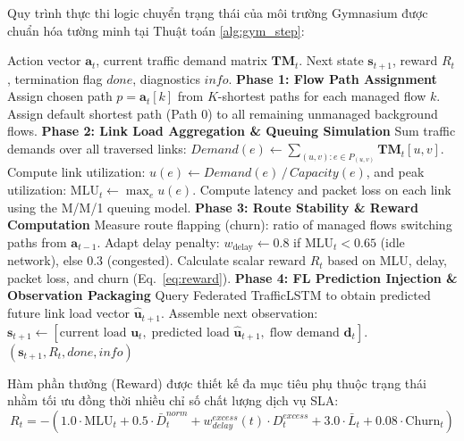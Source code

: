 \documentclass[11pt,a4paper]{article}
\begin{document}
Quy trình thực thi logic chuyển trạng thái của môi trường Gymnasium được chuẩn hóa tường minh tại Thuật toán \ref{alg:gym_step}:

\begin{algorithm}[htbp]
\caption{Gymnasium Routing Environment Step Logic}
\label{alg:gym_step}
\begin{algorithmic}[1]
\Require Action vector $\mathbf{a}_t$, current traffic demand matrix $\mathbf{TM}_t$.
\Ensure Next state $\mathbf{s}_{t+1}$, reward $R_t$, termination flag $done$, diagnostics $info$.
\Statex \textbf{Phase 1: Flow Path Assignment}
\State Assign chosen path $p = \mathbf{a}_t[k]$ from $K$-shortest paths for each managed flow $k$.
\State Assign default shortest path (Path 0) to all remaining unmanaged background flows.
\Statex \textbf{Phase 2: Link Load Aggregation \& Queuing Simulation}
\State Sum traffic demands over all traversed links: $Demand(e) \gets \sum_{(u, v): e \in P_{(u,v)}} \mathbf{TM}_t[u, v]$.
\State Compute link utilization: $u(e) \gets Demand(e) \,/\, Capacity(e)$, and peak utilization: $\text{MLU}_t \gets \max_{e} u(e)$.
\State Compute latency and packet loss on each link using the M/M/1 queuing model.
\Statex \textbf{Phase 3: Route Stability \& Reward Computation}
\State Measure route flapping (churn): ratio of managed flows switching paths from $\mathbf{a}_{t-1}$.
\State Adapt delay penalty: $w_{\text{delay}} \gets 0.8$ if $\text{MLU}_t < 0.65$ (idle network), else $0.3$ (congested).
\State Calculate scalar reward $R_t$ based on MLU, delay, packet loss, and churn (Eq.~\ref{eq:reward}).
\Statex \textbf{Phase 4: FL Prediction Injection \& Observation Packaging}
\State Query Federated TrafficLSTM to obtain predicted future link load vector $\mathbf{\hat{u}}_{t+1}$.
\State Assemble next observation: $\mathbf{s}_{t+1} \gets [\text{current load } \mathbf{u}_t, \; \text{predicted load } \mathbf{\hat{u}}_{t+1}, \; \text{flow demand } \mathbf{d}_t]$.
\State \Return $(\mathbf{s}_{t+1}, R_t, done, info)$
\end{algorithmic}
\end{algorithm}

Hàm phần thưởng (Reward) được thiết kế đa mục tiêu phụ thuộc trạng thái nhằm tối ưu đồng thời nhiều chỉ số chất lượng dịch vụ SLA:
\begin{equation}
\label{eq:reward}
    R_t = -\left( 1.0 \cdot \text{MLU}_t + 0.5 \cdot \bar{D}_t^{norm} + w_{delay}^{excess}(t) \cdot D_t^{excess} + 3.0 \cdot \bar{L}_t + 0.08 \cdot \text{Churn}_t \right)
\end{equation}
\end{document}
